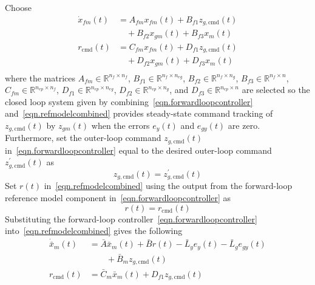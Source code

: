 \documentclass[journal]{IEEEtran}
\theoremstyle{innercustomthm}
\begin{document}
  Choose
  {%
    \small
    \begin{equation}
      \label{eqn.forwardloopcontroller}
      \begin{split}
        \dot{x}_{fm}(t) &= A_{fm}x_{fm}(t) + B_{f1}z_{g,\text{cmd}}(t) \\
        & \quad + B_{f2}x_{gm}(t) + B_{f3}x_{m}(t) \\
        r_{\text{cmd}}(t) &= C_{fm}x_{fm}(t) + D_{f1}z_{g,\text{cmd}}(t) \\
        & \quad + D_{f2}x_{gm}(t) + D_{f3} x_{m}(t) \\
      \end{split}
    \end{equation}
  }%
  where the matrices $A_{fm}\in\mathbb{R}^{n_{f}\times n_{f}}$, $B_{f1}\in\mathbb{R}^{n_{f}\times n_{eg}}$, $B_{f2}\in\mathbb{R}^{n_{f}\times n_{g}}$, $B_{f3}\in\mathbb{R}^{n_{f}\times n}$, $C_{fm}\in\mathbb{R}^{n_{ep}\times n_{f}}$, $D_{f1}\in\mathbb{R}^{n_{ep}\times n_{eg}}$, $D_{f2}\in\mathbb{R}^{n_{ep}\times n_{g}}$, and $D_{f3}\in\mathbb{R}^{n_{ep}\times n}$ are selected so the closed loop system given by combining\ \eqref{eqn.forwardloopcontroller} and\ \eqref{eqn.refmodelcombined} provides steady-state command tracking of $z_{g,\text{cmd}}(t)$ by $z_{gm}(t)$ when the errors $e_{y}(t)$ and $e_{gy}(t)$ are zero.
  Furthermore, set the outer-loop command $z_{g,\text{cmd}}(t)$ in\ \eqref{eqn.forwardloopcontroller} equal to the desired outer-loop command $z_{g,\text{cmd}}^{\prime}(t)$ as
  \begin{equation}
    \label{eqn.zgcmdzgcmdprime}
    z_{g,\text{cmd}}(t) = z_{g,\text{cmd}}^{\prime}(t)
  \end{equation}
  Set $r(t)$ in\ \eqref{eqn.refmodelcombined} using the output from the forward-loop reference model component in\ \eqref{eqn.forwardloopcontroller} as
  \begin{equation}
    \label{eqn.rrcmd}
    r(t) = r_{\text{cmd}}(t)
  \end{equation}
  Substituting the forward-loop controller\ \eqref{eqn.forwardloopcontroller} into\ \eqref{eqn.refmodelcombined} gives the following
  {\small
  \begin{equation}
    \label{eqn.xbareqnopenloop}
    \begin{split}
      \dot{\bar{x}}_{m}(t) &= \bar{A}\bar{x}_{m}(t) + \bar{B}r(t) - \bar{L}_{y}e_{y}(t) - \bar{L}_{g}e_{gy}(t) \\
      & \qquad + \bar{B}_{m}z_{g,\text{cmd}}(t) \\
      r_{\text{cmd}}(t) &= \bar{C}_{m}\bar{x}_{m}(t) + D_{f1}z_{g,\text{cmd}}(t) \\
    \end{split}
  \end{equation}
  }%
\end{document}
